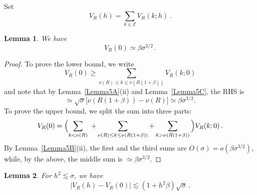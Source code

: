 \documentclass[11pt]{amsart}
\numberwithin{equation}{section}
\newtheorem{lemma}{Lemma}[section]
\newcommand{\bZ}{\mathbb Z}
\begin{document}
Set
\[
V_R(h) = \sum_{k\in\bZ} V_R(k; h)\,.
\]

\begin{lemma}\label{Lemma10a} We have
\[
V_R(0) \simeq \beta \sigma^{3/2}\,.
\]
\end{lemma}

\begin{proof}
To prove the lower bound, we write
\[
V_R(0) \ge \sum_{\nu(R)\le k \le \nu(R(1+\beta))}  V_R(k; 0)
\]
and note that by Lemma~\ref{Lemma5A}(ii) and Lemma~\ref{Lemma5C},
the RHS is
\[
\simeq \sqrt{\sigma} \bigl[ \nu(R(1+\beta)) - \nu (R) \bigr] \simeq \beta \sigma^{3/2}.
\]
To prove the upper bound, we split the sum into three parts:
\[
V_R(0) = \Bigl( \sum_{k<\nu (R)}\ + \sum_{\nu(R)\le k \le \nu(R(1+\beta))}
+ \sum_{k>\nu(R(1+\beta))}\, \Bigr) V_R(k; 0)\,.
\]
By Lemma~\ref{Lemma5B}(ii), the first and the third sums are $O(\sigma)=o(\beta\sigma^{3/2})$,
while, by the above, the middle sum is $\simeq \beta\sigma^{3/2}$.
\end{proof}

\begin{lemma}\label{Lemma10b} For $ h^2 \lesssim \sigma $, we have
\[
|V_R(h) - V_R(0)| \lesssim (1+ h^2\beta)\sqrt{\sigma}\,.
\]
\end{lemma}
\end{document}

